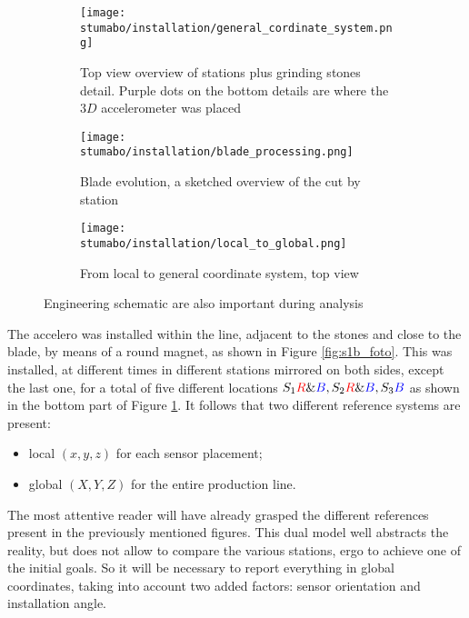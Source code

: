 \begin{figure}[ht]
    \begin{subfigure}{\textwidth}
        \texttt{[image: stumabo/installation/general\_cordinate\_system.png]}
        \caption{Top view overview of stations plus grinding stones detail.
            Purple dots on the bottom details are where the $3D$ accelerometer was placed}
        \label{fig:top_view_line}
    \end{subfigure}
    \begin{subfigure}{\textwidth}
        \texttt{[image: stumabo/installation/blade\_processing.png]}
        \caption{Blade evolution, a sketched overview of the cut by station}
        \label{fig:blade_evolution}
    \end{subfigure}
    \begin{subfigure}{\textwidth}
        \texttt{[image: stumabo/installation/local\_to\_global.png]}
        \caption{From local to general coordinate system, top view}
        \label{fig:local_to_global}
    \end{subfigure}
    \caption{Engineering schematic are also important during analysis}
    \label{fig:engineering_files}
\end{figure}

The accelero was installed within the line, adjacent to the stones and close to the blade, by means of a round magnet, as shown in Figure \ref{fig:s1b_foto}.
This was installed, at different times in different stations mirrored on both sides, except the last one, for a total of five different locations 
${S_{1}\textcolor{red}{R}\&\textcolor{blue}{B}, S_{2}\textcolor{red}{R}\&\textcolor{blue}{B}, S_{3}\textcolor{blue}{B}}$ as shown in the bottom part of Figure \ref{fig:top_view_line}.
It follows that two different reference systems are present:
\begin{itemize}
    \item local $(x,y,z)$ for each sensor placement;
    \item global $(X,Y,Z)$ for the entire production line.
\end{itemize}
The most attentive reader will have already grasped the different references present in the previously mentioned figures.
This dual model well abstracts the reality, but does not allow to compare the various stations, ergo to achieve one of the initial goals.
So it will be necessary to report everything in global coordinates, taking into account two added factors: sensor orientation and installation angle. 

